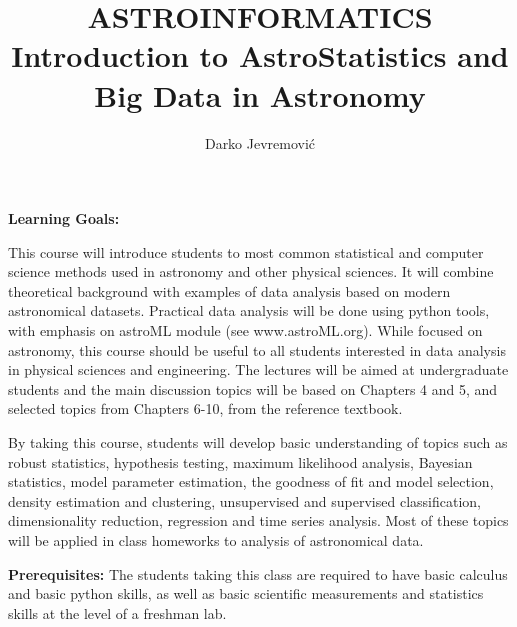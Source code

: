 \documentclass[10pt]{article}
\title{ASTROINFORMATICS\\
  Introduction to AstroStatistics and Big Data in Astronomy}
\author{Darko Jevremovi\'{c}}
\affil{Astronomical Observatory Belgrade, Fall 2018}
\date{\vspace{-5ex}}
\begin{document}
\maketitle

\vskip 0.3in

\vskip 0.2in
\vskip 0.2in
\vskip 0.2in
\vskip 0.2in
\vskip 0.3in

{\bf Learning Goals:}

This course will introduce students to most common statistical and computer science methods 
used in astronomy and other physical sciences. It will combine theoretical background with 
examples of data analysis based on modern astronomical datasets. Practical data analysis 
will be done using python tools, with emphasis on astroML module (see www.astroML.org). 
While focused on astronomy, this course should be useful to all students interested in data 
analysis in physical sciences and engineering. The lectures will be aimed at undergraduate 
students and the main discussion topics will be based on  Chapters 4 and 5, and selected 
topics from Chapters 6-10, from the reference textbook. 

By taking this course, students will develop basic understanding of topics such as robust 
statistics, hypothesis testing, maximum likelihood analysis, Bayesian statistics, model 
parameter estimation, the goodness of fit and model selection, density estimation and 
clustering, unsupervised and supervised classification, dimensionality reduction, 
regression and time series analysis. Most of these topics will be applied in class homeworks 
to analysis of astronomical data. 

{\bf Prerequisites:}
The students taking this class are required to have basic calculus and basic python skills, 
as well as basic scientific measurements and statistics skills at the level of a freshman lab. 
\end{document}

